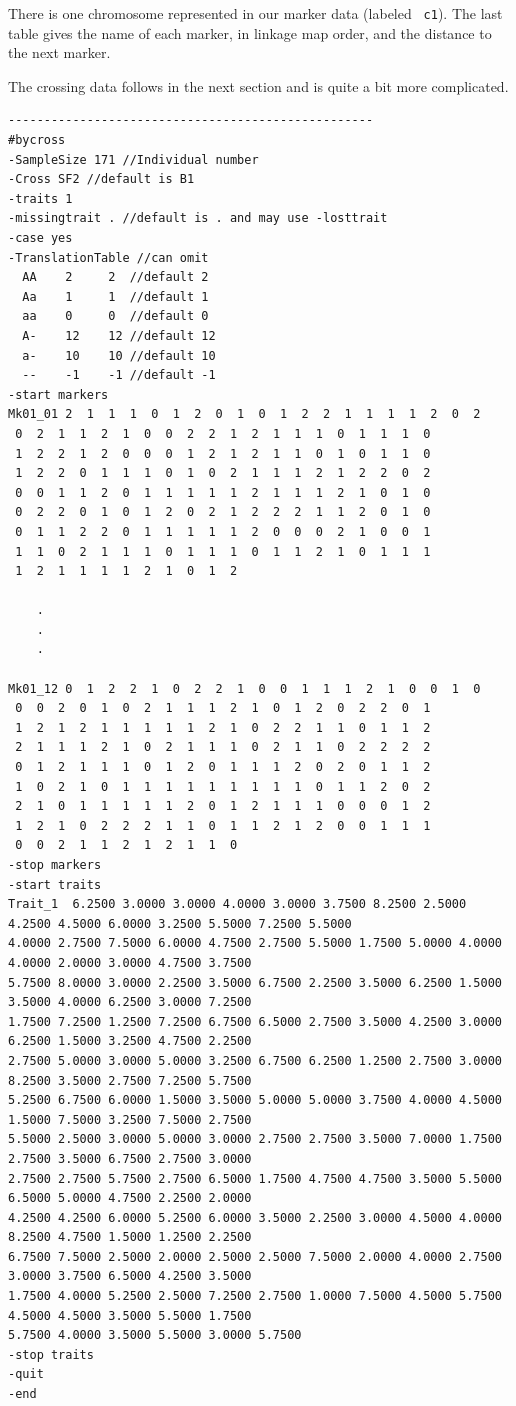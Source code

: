 There is one chromosome represented in our marker data (labeled {\tt
c1}). The last table gives the name of each marker, in linkage map
order, and the distance to the next marker.

The crossing data follows in the next section and is quite a bit more
complicated.

{\scriptsize
\begin{verbatim}
---------------------------------------------------
#bycross
-SampleSize 171 //Individual number
-Cross SF2 //default is B1
-traits 1
-missingtrait . //default is . and may use -losttrait
-case yes
-TranslationTable //can omit
  AA    2     2  //default 2
  Aa    1     1  //default 1
  aa    0     0  //default 0
  A-    12    12 //default 12
  a-    10    10 //default 10
  --    -1    -1 //default -1
-start markers
Mk01_01 2  1  1  1  0  1  2  0  1  0  1  2  2  1  1  1  1  2  0  2 
 0  2  1  1  2  1  0  0  2  2  1  2  1  1  1  0  1  1  1  0 
 1  2  2  1  2  0  0  0  1  2  1  2  1  1  0  1  0  1  1  0 
 1  2  2  0  1  1  1  0  1  0  2  1  1  1  2  1  2  2  0  2 
 0  0  1  1  2  0  1  1  1  1  1  2  1  1  1  2  1  0  1  0 
 0  2  2  0  1  0  1  2  0  2  1  2  2  2  1  1  2  0  1  0 
 0  1  1  2  2  0  1  1  1  1  1  2  0  0  0  2  1  0  0  1 
 1  1  0  2  1  1  1  0  1  1  1  0  1  1  2  1  0  1  1  1 
 1  2  1  1  1  1  2  1  0  1  2 
    
    .
    .
    .

Mk01_12 0  1  2  2  1  0  2  2  1  0  0  1  1  1  2  1  0  0  1  0 
 0  0  2  0  1  0  2  1  1  1  2  1  0  1  2  0  2  2  0  1 
 1  2  1  2  1  1  1  1  1  2  1  0  2  2  1  1  0  1  1  2 
 2  1  1  1  2  1  0  2  1  1  1  0  2  1  1  0  2  2  2  2 
 0  1  2  1  1  1  0  1  2  0  1  1  1  2  0  2  0  1  1  2 
 1  0  2  1  0  1  1  1  1  1  1  1  1  1  0  1  1  2  0  2 
 2  1  0  1  1  1  1  1  2  0  1  2  1  1  1  0  0  0  1  2 
 1  2  1  0  2  2  2  1  1  0  1  1  2  1  2  0  0  1  1  1 
 0  0  2  1  1  2  1  2  1  1  0 
-stop markers
-start traits
Trait_1  6.2500 3.0000 3.0000 4.0000 3.0000 3.7500 8.2500 2.5000 4.2500 4.5000 6.0000 3.2500 5.5000 7.2500 5.5000 
4.0000 2.7500 7.5000 6.0000 4.7500 2.7500 5.5000 1.7500 5.0000 4.0000 4.0000 2.0000 3.0000 4.7500 3.7500 
5.7500 8.0000 3.0000 2.2500 3.5000 6.7500 2.2500 3.5000 6.2500 1.5000 3.5000 4.0000 6.2500 3.0000 7.2500 
1.7500 7.2500 1.2500 7.2500 6.7500 6.5000 2.7500 3.5000 4.2500 3.0000 6.2500 1.5000 3.2500 4.7500 2.2500 
2.7500 5.0000 3.0000 5.0000 3.2500 6.7500 6.2500 1.2500 2.7500 3.0000 8.2500 3.5000 2.7500 7.2500 5.7500 
5.2500 6.7500 6.0000 1.5000 3.5000 5.0000 5.0000 3.7500 4.0000 4.5000 1.5000 7.5000 3.2500 7.5000 2.7500 
5.5000 2.5000 3.0000 5.0000 3.0000 2.7500 2.7500 3.5000 7.0000 1.7500 2.7500 3.5000 6.7500 2.7500 3.0000 
2.7500 2.7500 5.7500 2.7500 6.5000 1.7500 4.7500 4.7500 3.5000 5.5000 6.5000 5.0000 4.7500 2.2500 2.0000 
4.2500 4.2500 6.0000 5.2500 6.0000 3.5000 2.2500 3.0000 4.5000 4.0000 8.2500 4.7500 1.5000 1.2500 2.2500 
6.7500 7.5000 2.5000 2.0000 2.5000 2.5000 7.5000 2.0000 4.0000 2.7500 3.0000 3.7500 6.5000 4.2500 3.5000 
1.7500 4.0000 5.2500 2.5000 7.2500 2.7500 1.0000 7.5000 4.5000 5.7500 4.5000 4.5000 3.5000 5.5000 1.7500 
5.7500 4.0000 3.5000 5.5000 3.0000 5.7500 
-stop traits
-quit
-end
\end{verbatim}
}

